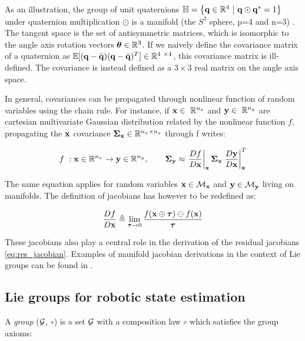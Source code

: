 As an illustration, the group of unit quaternions $\mathbb{H} = \left\{ {\bf q} \in \mathbb{R}^4~|~{\bf q} \odot {\bf q}^*=1 \right\}$ under quaternion multiplication 
$\odot$ is a manifold (the $S^3$ sphere, p=4 and n=3) \cite{sola2012quaternion}. 
The tangent space is the set of antisymmetric matrices, which is isomorphic to the angle axis rotation vectors ${\bm \theta} \in \mathbb{R}^3$.
If we naively define the covariance matrix of a quaternion as \mbox{$\mathbb{E}[(\bfq - \bar{\bfq})(\bfq - \bar{\bfq})^T] \in \Reals^{4 \times 4}$}, 
this covariance matrix is ill-defined. The covariance is instead defined as a $3 \times 3$ real matrix on the angle axis space.

In general, covariances can be propagated through nonlinear function of random variables using the chain rule. For instance, if $\bfx \in \Reals^{n_x}$ and 
$\bfy \in \Reals^{n_y}$ are cartesian multivariate Gaussian distribution related by the nonlinear function $f$, propagating the ${\bf x}$ covariance 
${\bm \Sigma}_{{\bf x}} \in \mathbb{R}^{n_x \times n_x}$ through f writes:

\begin{equation}
    f~: {\bf x} \in \mathbb{R}^{n_x} \rightarrow {\bf y} \in \mathbb{R}^{n_y}, \quad \quad {\bm \Sigma}_{{\bf y}} \approx 
                \left.\frac{D f}{D {\bf x}} \right|_{{\bf x}}   {\bm \Sigma}_{{\bf x}}    \left.\frac{D {\bf y}}{D {\bf x}}\right|_{{\bf x}}^T
\end{equation}

The same equation applies for random variables ${\bf x} \in \mathcal{M}_{{\bf x}}$ and ${\bf y} \in \mathcal{M}_{{\bf y}}$ living on manifolds. The definition of jacobians has however
to be redefined as:

\begin{equation}
    \frac{D f}{D {\bf x}} \triangleq \lim_{{\bm \tau} \to 0} \frac{f({\bf x} \oplus {\bm \tau}) \ominus f({\bf x})}{{\bm \tau}}
\end{equation}

These jacobians also play a central role in the derivation of the residual jacobians \ref{eq:res_jacobian}.
Examples of manifold jacobian derivations in the context of Lie groups can be found in \cite{sola2018micro}.  



\subsection{Lie groups for robotic state estimation}
A \textit{group} ($\mathcal{G}$, $\circ$) is a set $\mathcal{G}$ with a composition law $\circ$ which satisfies the group axioms:

